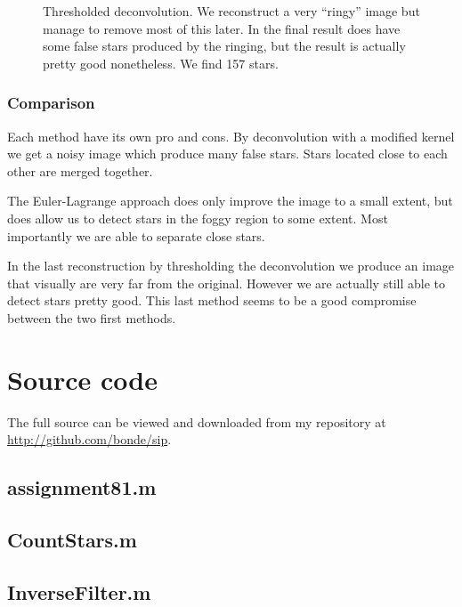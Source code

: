 \documentclass[a4paper, 10pt, final]{article}
\def\repository{\url{http://github.com/bonde/sip}}
\begin{document}
\begin{figure}[!h]
    \caption[]{Thresholded deconvolution. We reconstruct a very
    ``ringy'' image but manage to remove most of this later. In the
    final result does have some false stars produced by the ringing, but
    the result is actually pretty good nonetheless. We find 157 stars.}
    \label{countstars_tres}
\end{figure}

\subsubsection*{Comparison}
Each method have its own pro and cons. By deconvolution with a modified
kernel we get a noisy image which produce many false stars. Stars
located close to each other are merged together.

The Euler-Lagrange approach does only improve the image to a small
extent, but does allow us to detect stars in the foggy region to some
extent. Most importantly we are able to separate close stars.

In the last reconstruction by thresholding the deconvolution we produce
an image that visually are very far from the original. However we are
actually still able to detect stars pretty good. This last method seems
to be a good compromise between the two first methods.

\clearpage





\appendix
\lstset{language=Matlab, basicstyle=\scriptsize,
    showstringspaces=false, numbers=left, stepnumber=1,
    numberstyle=\tiny, frame=none}
\section{Source code}
The full source can be viewed and downloaded from my repository at
\repository{}.

\subsection{assignment81.m}


\subsection{CountStars.m}


\subsection{InverseFilter.m}

\end{document}
